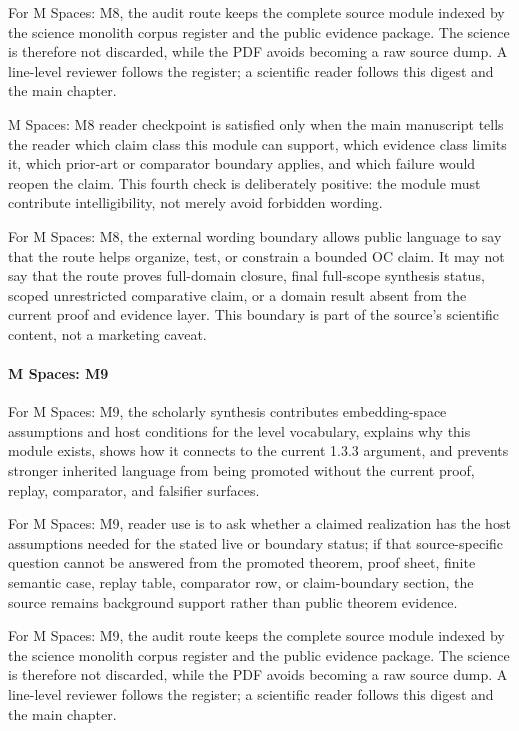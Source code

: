 For M Spaces: M8, the audit route keeps the complete source module indexed by the science monolith corpus register and the public evidence package. The science is therefore not discarded, while the PDF avoids becoming a raw source dump. A line-level reviewer follows the register; a scientific reader follows this digest and the main chapter.


M Spaces: M8 reader checkpoint is satisfied only when the main manuscript tells the reader which claim class this module can support, which evidence class limits it, which prior-art or comparator boundary applies, and which failure would reopen the claim. This fourth check is deliberately positive: the module must contribute intelligibility, not merely avoid forbidden wording.


For M Spaces: M8, the external wording boundary allows public language to say that the route helps organize, test, or constrain a bounded OC claim. It may not say that the route proves full-domain closure, final full-scope synthesis status, scoped unrestricted comparative claim, or a domain result absent from the current proof and evidence layer. This boundary is part of the source's scientific content, not a marketing caveat.


\paragraph{M Spaces: M9}

For M Spaces: M9, the scholarly synthesis contributes embedding-space assumptions and host conditions for the level vocabulary, explains why this module exists, shows how it connects to the current 1.3.3 argument, and prevents stronger inherited language from being promoted without the current proof, replay, comparator, and falsifier surfaces.


For M Spaces: M9, reader use is to ask whether a claimed realization has the host assumptions needed for the stated live or boundary status; if that source-specific question cannot be answered from the promoted theorem, proof sheet, finite semantic case, replay table, comparator row, or claim-boundary section, the source remains background support rather than public theorem evidence.


For M Spaces: M9, the audit route keeps the complete source module indexed by the science monolith corpus register and the public evidence package. The science is therefore not discarded, while the PDF avoids becoming a raw source dump. A line-level reviewer follows the register; a scientific reader follows this digest and the main chapter.


